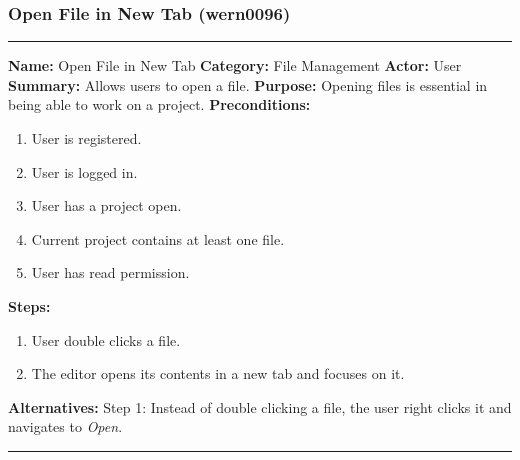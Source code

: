 \documentclass[11pt]{report}
\begin{document}
\subsubsection{Open File in New Tab (wern0096)}
\vspace{2pt}
\hrule
\vspace{8pt}
	\noindent\textbf{Name:} Open File in New Tab \newline
	\textbf{Category:} File Management \newline
	\textbf{Actor:} User \newline
	\textbf{Summary:} Allows users to open a file. \newline
	\textbf{Purpose:} Opening files is essential in being able to work on a project. \newline
	\textbf{Preconditions:}
	\begin{enumerate}
		\item User is registered.
		\item User is logged in.
		\item User has a project open.
		\item Current project contains at least one file.
		\item User has read permission.
	\end{enumerate}
	\textbf{Steps:}
	\begin{enumerate}
		\item User double clicks a file.
		\item The editor opens its contents in a new tab and focuses on it.
	\end{enumerate}
	\textbf{Alternatives:} Step 1: Instead of double clicking a file, the user right clicks it and navigates to \textit{Open}.
\vspace{8pt}
\hrule
\newpage
\end{document}
